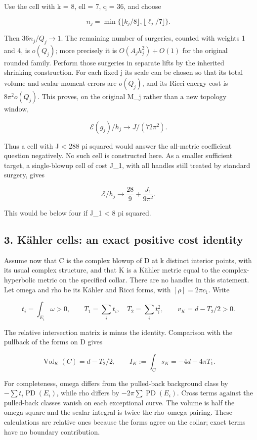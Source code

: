 \documentclass[
  10pt,
]{article}
\begin{document}
Use the cell with k = 8, ell = 7, q = 36, and choose

\[
 n_j=\min\{\lfloor k_j/8\rfloor,\lfloor\ell_j/7\rfloor\}.
\]

Then \(36n_j/Q_j\to1\). The remaining number of surgeries, counted with
weights 1 and 4, is \(o(Q_j)\); more precisely it is
\(O(A_jh_j^2)+O(1)\) for the original rounded family. Perform those
surgeries in separate lifts by the inherited shrinking construction. For
each fixed j its scale can be chosen so that its total volume and
scalar-moment errors are \(o(Q_j)\), and its Ricci-energy cost is
\(8\pi^2o(Q_j)\). This proves, on the original M\_j rather than a new
topology window,

\[
 \boxed{\mathcal E(g_j)/h_j\to J/(72\pi^2).}               \tag{2.3}
\]

Thus a cell with J \textless{} 288 pi squared would answer the
all-metric coefficient question negatively. No such cell is constructed
here. As a smaller sufficient target, a single-blowup cell of cost J\_1,
with all handles still treated by standard surgery, gives

\[
 \mathcal E/h_j\to\frac{28}{9}+\frac{J_1}{9\pi^2}.
\]

This would be below four if J\_1 \textless{} 8 pi squared.

\hypertarget{kuxe4hler-cells-an-exact-positive-cost-identity}{%
\subsection{3. Kähler cells: an exact positive cost
identity}\label{kuxe4hler-cells-an-exact-positive-cost-identity}}

Assume now that C is the complex blowup of D at k distinct interior
points, with its usual complex structure, and that K is a Kähler metric
equal to the complex-hyperbolic metric on the specified collar. There
are no handles in this statement. Let omega and rho be its Kähler and
Ricci forms, with \([\rho]=2\pi c_1\). Write

\[
 t_i=\int_{E_i}\omega>0,\qquad T_1=\sum_i t_i,\quad T_2=\sum_i t_i^2,
 \qquad v_K=d-T_2/2>0.
\]

The relative intersection matrix is minus the identity. Comparison with
the pullback of the forms on D gives

\[
 \operatorname{Vol}_K(C)=d-T_2/2,\qquad
 I_K:=\int_Cs_K=-4d-4\pi T_1.                             \tag{3.1}
\]

For completeness, omega differs from the pulled-back background class by
\(-\sum t_i\operatorname{PD}(E_i)\), while rho differs by
\(-2\pi\sum\operatorname{PD}(E_i)\). Cross terms against the pulled-back
classes vanish on each exceptional curve. The volume is half the
omega-square and the scalar integral is twice the rho--omega pairing.
These calculations are relative ones because the forms agree on the
collar; exact terms have no boundary contribution.
\end{document}
